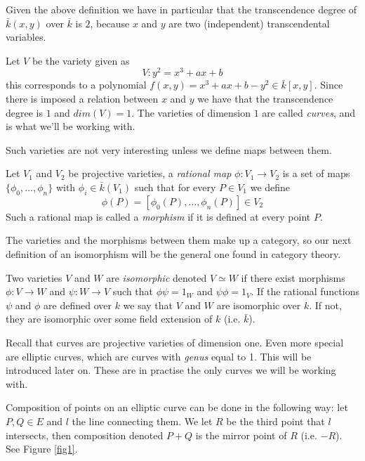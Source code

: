 Given the above definition we have in particular that the transcendence degree of $\bar{k}(x,y)$ over
$\bar{k}$ is $2$, because $x$ and $y$ are two (independent) transcendental variables.

\begin{ex}
 Let $V$ be the variety given as
$$ V: y^2 = x^3 + ax + b $$
this corresponds to a polynomial $f(x,y) = x^3+ax+b-y^2 \in \bar{k}[x,y]$. Since there
is imposed a relation between $x$ and $y$ we  have that the transcendence degree is $1$ and
$dim(V)=1$. The varieties of dimension $1$ are called \emph{curves}, and is what we'll be working with.
\end{ex}

Such varieties are not very interesting unless we define maps between them.

\begin{mydef}
 Let $V_1$ and $V_2$ be projective varieties, a \emph{rational map} $\phi: V_1 \rightarrow V_2$
is a set of maps $\{\phi_0,\ldots,\phi_n\}$ with $\phi_i \in \bar{k}(V_1)$ such that for every
$P\in V_1$ we define
$$\phi(P) = [\phi_0(P),\ldots,\phi_n(P)] \in V_2$$
Such a rational map is called a \emph{morphism} if it is defined at every point $P$.
\end{mydef}

The varieties and the morphisms between them make up a category, so our next
definition of an isomorphism will be the general one found in category theory.

\begin{mydef}
 Two varieties $V$ and $W$ are \emph{isomorphic} denoted $V\simeq W$
if there exist morphisms $\phi: V \rightarrow W$ and $\psi: W \rightarrow V$ such that
$\phi \psi = 1_W$ and $\psi \phi = 1_V$.
If the rational functions $\psi$ and $\phi$ are defined over $k$ we say that $V$ and $W$
are isomorphic over $k$. If not, they are isomorphic over some field extension of $k$
(i.e. $\bar{k}$).
\end{mydef}

Recall that curves are projective varieties of dimension one. Even more special
are elliptic curves, which are curves with \emph{genus} equal to 1. This will
be introduced later on. These are in practise the only curves we will be working with.

Composition of points on an elliptic curve can be done in the following way:
let $P,Q\in E$ and $l$ the line connecting them. We let $R$ be the third
point that $l$ intersects, then composition denoted $P+Q$ is the mirror
point of $R$ (i.e. $-R$). See Figure \ref{fig1}.

